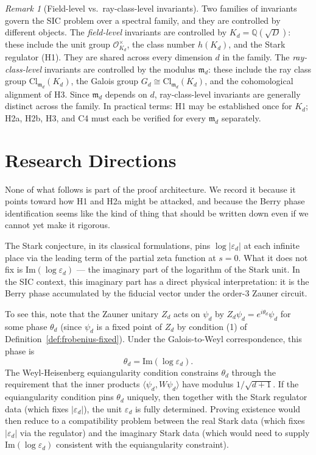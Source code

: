 \documentclass[12pt]{article}
\theoremstyle{plain}
\theoremstyle{definition}
\theoremstyle{remark}
\newtheorem{remark}[theoreminner]{Remark}
\newcommand{\OO}{\mathcal{O}}
\newcommand{\eps}{\varepsilon}
\newcommand{\bQ}{\mathbb{Q}}
\begin{document}
\begin{remark}[Field-level vs.\ ray-class-level invariants]
Two families of invariants govern the SIC problem over a spectral family, and they are controlled by different objects. The \emph{field-level} invariants are controlled by $K_d = \bQ(\sqrt{D})$: these include the unit group $\OO_{K_d}^\times$, the class number $h(K_d)$, and the Stark regulator (H1). They are shared across every dimension $d$ in the family. The \emph{ray-class-level} invariants are controlled by the modulus $\mathfrak{m}_d$: these include the ray class group $\mathrm{Cl}_{\mathfrak{m}_d}(K_d)$, the Galois group $G_d \cong \mathrm{Cl}_{\mathfrak{m}_d}(K_d)$, and the cohomological alignment of H3. Since $\mathfrak{m}_d$ depends on $d$, ray-class-level invariants are generally distinct across the family. In practical terms: H1 may be established once for $K_d$; H2a, H2b, H3, and C4 must each be verified for every $\mathfrak{m}_d$ separately.
\end{remark}

\section{Research Directions}
\label{sec:berry}

None of what follows is part of the proof architecture. We record it because it points toward how H1 and H2a might be attacked, and because the Berry phase identification seems like the kind of thing that should be written down even if we cannot yet make it rigorous.

The Stark conjecture, in its classical formulations, pins $\log|\eps_d|$ at each infinite place via the leading term of the partial zeta function at $s = 0$. What it does not fix is $\mathrm{Im}(\log \eps_d)$ — the imaginary part of the logarithm of the Stark unit. In the SIC context, this imaginary part has a direct physical interpretation: it is the Berry phase accumulated by the fiducial vector under the order-3 Zauner circuit.

To see this, note that the Zauner unitary $Z_d$ acts on $\psi_d$ by $Z_d \psi_d = e^{i\theta_d} \psi_d$ for some phase $\theta_d$ (since $\psi_d$ is a fixed point of $Z_d$ by condition (1) of Definition~\ref{def:frobenius-fixed}). Under the Galois-to-Weyl correspondence, this phase is
\[
  \theta_d = \mathrm{Im}(\log \eps_d).
\]
The Weyl-Heisenberg equiangularity condition constrains $\theta_d$ through the requirement that the inner products $\langle \psi_d, W\psi_d \rangle$ have modulus $1/\sqrt{d+1}$. If the equiangularity condition pins $\theta_d$ uniquely, then together with the Stark regulator data (which fixes $|\eps_d|$), the unit $\eps_d$ is fully determined. Proving existence would then reduce to a compatibility problem between the real Stark data (which fixes $|\eps_d|$ via the regulator) and the imaginary Stark data (which would need to supply $\mathrm{Im}(\log \eps_d)$ consistent with the equiangularity constraint).
\end{document}

